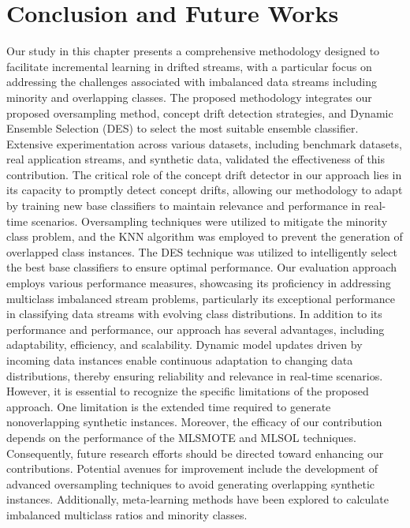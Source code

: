 %
%


\section{Conclusion and Future Works}
\label{sec:4_8_Conclusions}

Our study in this chapter presents a comprehensive methodology designed to facilitate incremental learning in drifted streams, with a particular focus on addressing the challenges associated with imbalanced data streams including minority and overlapping classes. The proposed methodology integrates our proposed oversampling method, concept drift detection strategies, and Dynamic Ensemble Selection (DES) to select the most suitable ensemble classifier. Extensive experimentation across various datasets, including benchmark datasets, real application streams, and synthetic data, validated the effectiveness of this contribution. The critical role of the concept drift detector in our approach lies in its capacity to promptly detect concept drifts, allowing our methodology to adapt by training new base classifiers to maintain relevance and performance in real-time scenarios. Oversampling techniques were utilized to mitigate the minority class problem, and the KNN algorithm was employed to prevent the generation of overlapped class instances. The DES technique was utilized to intelligently select the best base classifiers to ensure optimal performance. Our evaluation approach employs various performance measures, showcasing its proficiency in addressing multiclass imbalanced stream problems, particularly its exceptional performance in classifying data streams with evolving class distributions. In addition to its performance and performance, our approach has several advantages, including adaptability, efficiency, and scalability. Dynamic model updates driven by incoming data instances enable continuous adaptation to changing data distributions, thereby ensuring reliability and relevance in real-time scenarios. However, it is essential to recognize the specific limitations of the proposed approach. One limitation is the extended time required to generate nonoverlapping synthetic instances. Moreover, the efficacy of our contribution depends on the performance of the MLSMOTE and MLSOL techniques. Consequently, future research efforts should be directed toward enhancing our contributions. Potential avenues for improvement include the development of advanced oversampling techniques to avoid generating overlapping synthetic instances. Additionally, meta-learning methods have been explored to calculate imbalanced multiclass ratios and minority classes.